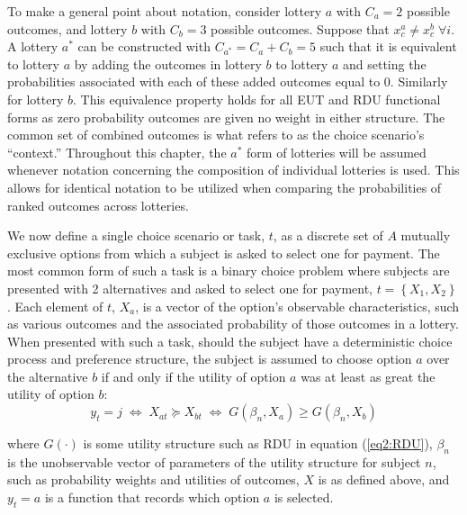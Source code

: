 \documentclass[../main.tex]{subfiles}
\begin{document}
To make a general point about notation, consider lottery $a$ with $C_a = 2$ possible outcomes, and lottery $b$ with $C_b = 3$ possible outcomes.
Suppose that $x_c^a \neq x_c^b \; \forall i$.
A lottery $a^*$ can be constructed with $C_{a^*}= C_a + C_b = 5$ such that it is equivalent to lottery $a$ by adding the outcomes in lottery $b$ to lottery $a$ and setting the probabilities associated with each of these added outcomes equal to $0$.
Similarly for lottery $b$.
This equivalence property holds for all EUT and RDU functional forms as zero probability outcomes are given no weight in either structure.
The common set of combined outcomes is what \textcite{Wilcox2008} refers to as the choice scenario's \enquote{context.}
Throughout this chapter, the $a^*$ form of lotteries will be assumed whenever notation concerning the composition of individual lotteries is used.
This allows for identical notation to be utilized when comparing the probabilities of ranked outcomes across lotteries.

We now define a single choice scenario or task, $t$, as a discrete set of $A$ mutually exclusive options from which a subject is asked to select one for payment.
The most common form of such a task is a binary choice problem where subjects are presented with 2 alternatives and asked to select one for payment, $t=\left\{X_1,X_2\right\}$ .
Each element of $t$, $X_a$, is a vector of the option's observable characteristics, such as various outcomes and the associated probability of those outcomes in a lottery.
When presented with such a task, should the subject have a deterministic choice process and preference structure, the subject is assumed to choose option $a$ over the alternative $b$ if and only if the utility of option $a$ was at least as great the utility of option $b$:
\begin{equation}
	\label{eq2:ychoice}
	y_t = j \;\Leftrightarrow\; X_{at} \succcurlyeq X_{bt} \;\Leftrightarrow\; G(\beta_n , X_a) \geq G(\beta_n , X_b)
\end{equation}

\noindent where $G(\cdot)$ is some utility structure such as RDU in equation (\ref{eq2:RDU}), $\beta_n$ is the unobservable vector of parameters of the utility structure for subject $n$, such as probability weights and utilities of outcomes, $X$ is as defined above, and $y_t=a$ is a function that records which option $a$ is selected.
\end{document}

